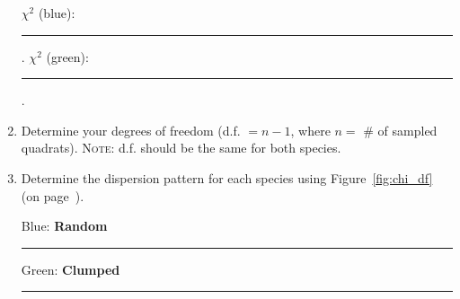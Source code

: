 \documentclass[12pt, hidelinks]{exam}
\newcommand\chisq{$\chi^2$}
\newcommand*\AnswerBlank{\rule{0.75in}{0.4pt}\kern0.67pt.}
\begin{document}
\begin{enumerate}
\bigskip

\chisq{} (blue): \AnswerBlank{} \qquad \chisq{} (green): \AnswerBlank{}

\item Determine your degrees of freedom (d.f. $= n-1$, where $n =$ \# of sampled
quadrats). \textsc{Note:} d.f. should be the same for both species.

\item Determine the dispersion pattern for each species using Figure~\ref{fig:chi_df} (on page~\pageref{fig:chi_df}).

\bigskip

Blue: \ifprintanswers\textbf{Random}\else\rule{1.5in}{0.4pt}\fi \qquad Green: \ifprintanswers\textbf{Clumped}\else\rule{1.5in}{0.4pt}\fi

\end{enumerate}

\newpage
\end{document}

